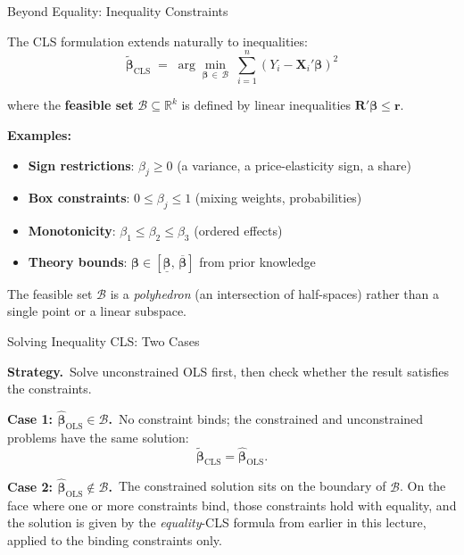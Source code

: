 \documentclass[handout, aspectratio=169]{beamer}
\numberwithin{equation}{section}
\begin{document}
\begin{frame}{Beyond Equality: Inequality Constraints}

The CLS formulation extends naturally to inequalities:
$$\tilde{\bm{\beta}}_{\text{CLS}} \;=\; \arg\min_{\bm{\beta}\,\in\,\mathcal{B}} \;\sum_{i=1}^n (Y_i - \bm{X}_i'\bm{\beta})^2$$

\noindent where the \textbf{feasible set} $\mathcal{B} \subseteq \mathbb{R}^k$ is defined by linear inequalities $\bm{R}'\bm{\beta} \leq \bm{r}$.

\pause
\bigskip

\textbf{Examples:}
\begin{itemize}
\item \textbf{Sign restrictions}: $\beta_j \geq 0$ (a variance, a price-elasticity sign, a share)
\item \textbf{Box constraints}: $0 \leq \beta_j \leq 1$ (mixing weights, probabilities)
\item \textbf{Monotonicity}: $\beta_1 \leq \beta_2 \leq \beta_3$ (ordered effects)
\item \textbf{Theory bounds}: $\bm{\beta} \in [\underline{\bm{\beta}},\, \overline{\bm{\beta}}]$ from prior knowledge
\end{itemize}

\pause
\bigskip

The feasible set $\mathcal{B}$ is a \emph{polyhedron} (an intersection of half-spaces) rather than a single point or a linear subspace.
\end{frame}

\begin{frame}{Solving Inequality CLS: Two Cases}

\textbf{Strategy.}\, Solve unconstrained OLS first, then check whether the result satisfies the constraints.

\pause
\bigskip

\textbf{Case 1: $\hat{\bm{\beta}}_{\text{OLS}} \in \mathcal{B}$.}\, No constraint binds; the constrained and unconstrained problems have the same solution:
$$\tilde{\bm{\beta}}_{\text{CLS}} = \hat{\bm{\beta}}_{\text{OLS}}.$$

\pause
\bigskip

\textbf{Case 2: $\hat{\bm{\beta}}_{\text{OLS}} \notin \mathcal{B}$.}\, The constrained solution sits on the boundary of $\mathcal{B}$.  On the face where one or more constraints bind, those constraints hold with equality, and the solution is given by the \emph{equality}-CLS formula from earlier in this lecture, applied to the binding constraints only.
\end{frame}
\end{document}
